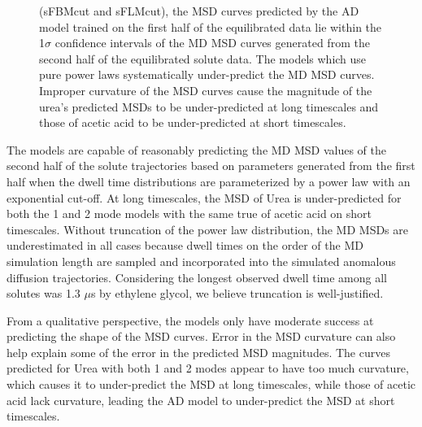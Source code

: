 \documentclass[12pt]{article}
\begin{document}
\begin{figure}
{  (sFBMcut and sFLMcut), the MSD curves predicted by the AD model trained on 
  the first half of the equilibrated data lie within the 1$\sigma$ confidence
  intervals of the MD MSD curves generated from the second half of the equilibrated
  solute data. The models which use pure power laws systematically under-predict
  the MD MSD curves. 
Improper curvature of the MSD curves cause the magnitude of
  the urea's predicted MSDs to be under-predicted at long timescales and those
  of acetic acid to be under-predicted at short timescales.}\label{fig:train_test}
  \end{figure}
  
  The models are capable of reasonably predicting the MD MSD values of the second
  half of the solute trajectories based on parameters generated from the first half
  when the dwell time distributions are parameterized by a power law with an 
  exponential cut-off. At long timescales, the MSD of Urea is under-predicted 
  for both the 1 and 2 mode models with the same true of acetic acid on short 
  timescales. Without truncation of the power law distribution, the MD 
  MSDs are underestimated in all cases because dwell times on the order of the
  MD simulation length are sampled and incorporated into the simulated anomalous
  diffusion trajectories. Considering the longest observed dwell time among all
  solutes was 1.3 $\mu$s by ethylene glycol, we believe truncation is well-justified.
  
  
  From a qualitative perspective, the models only have moderate success at predicting
  the shape of the MSD curves. Error in the MSD curvature can also help explain some of
  the error in the predicted MSD magnitudes. The curves predicted for Urea with both 1 
  and 2 modes appear to have too much curvature, which causes it to under-predict the 
  MSD at long timescales, while those of acetic acid lack curvature, leading the
  AD model to under-predict the MSD at short timescales. 
  
\end{document}
